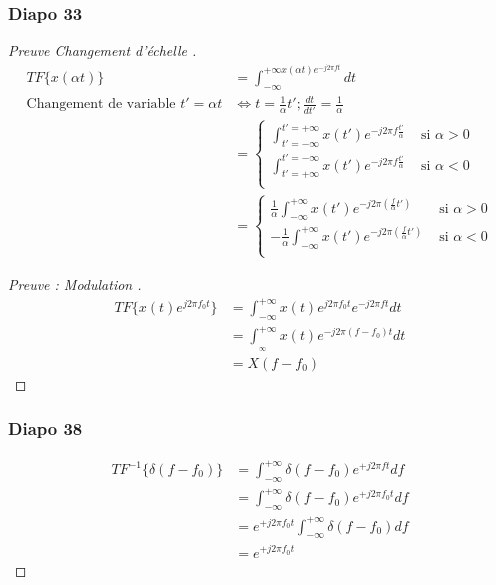\documentclass{article}
\theoremstyle{plain}%
\theoremstyle{definition}
\theoremstyle{remark}
\begin{document}
\subsubsection{Diapo 33}
\begin{proof}[Preuve Changement d'échelle ]
\begin{align*}
    TF\{x(\alpha t)\} &= \int_{-\infty }^{+\infty x(\alpha t) e^{-j2 \pi ft}}dt \\
        \text{Changement de variable }t ' = \alpha t &\Leftrightarrow t = \frac{1}{\alpha }t' ; \frac{dt}{dt ' } = \frac{1}{\alpha } \\
        &= \begin{cases}
            \int_{t ' = - \infty }^{t ' = + \infty } x(t ' )e^{-j 2 \pi f \frac{t ' }{\alpha }} &\text{ si } \alpha > 0\\
            \int_{t ' = + \infty }^{t ' = - \infty } x(t ' )e^{-j 2 \pi f \frac{t ' }{\alpha }} &\text{ si } \alpha < 0\\
        \end{cases} \\
        &= \begin{cases}
            \frac{1}{\alpha } \int_{-\infty }^{+\infty }x(t ' ) e^{-j 2 \pi (\frac{f}{\alpha } t ' )} &\text{ si } \alpha > 0\\
            - \frac{1}{\alpha } \int_{-\infty }^{+\infty }x(t ' ) e^{-j 2 \pi (\frac{f}{\alpha } t ' )} &\text{ si } \alpha < 0\\
        \end{cases} 
\end{align*}

\begin{proof}[Preuve : Modulation ]
    \begin{align*}
        TF \{x(t) e^{j 2 \pi f_0 t}\} &= \int_{-\infty }^{+\infty }x(t) e^{j 2 \pi f_0 t} e^{-j 2 \pi f t}dt \\
            &= \int_{_\infty}^{+\infty }x(t) e^{-j 2 \pi (f - f_0)t}dt \\
            &= X(f - f_0)
    \end{align*}
\end{proof}

\subsubsection{Diapo 38}
\begin{align*}
    TF^{-1}\{\delta (f - f_0)\} &= \int_{-\infty }^{+\infty }\delta (f - f_0) e^{+j2 \pi ft}df \\
    &= \int_{-\infty }^{+\infty }\delta (f - f_0) e^{+j2 \pi f_0 t}df \\
    &= e^{+j2 \pi f_0 t} \int_{-\infty }^{+\infty }\delta (f - f_0) df \\
    &= e^{+j2 \pi f_0 t}
\end{align*}

\end{proof}
\end{document}
